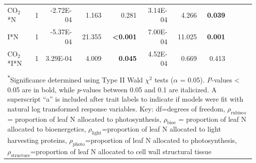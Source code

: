 \begin{landscape}
\begin{table}[]
{\begin{tabular}{p{3cm}p{0.5cm}p{1.75cm}p{1.5cm}p{1.5cm}p{1.75cm}p{1.5cm}p{1.5cm}p{1.75cm}p{1.5cm}p{1.5cm}}
            CO$_2$*N & \multicolumn{1}{r}{1}
            & \multicolumn{1}{r}{-2.72E-04}     & \multicolumn{1}{r}{1.163}         & \multicolumn{1}{r}{0.281}
            & \multicolumn{1}{r}{3.14E-04}      & \multicolumn{1}{r}{4.266}         & \multicolumn{1}{r}{\textbf{0.039}}
            & \multicolumn{1}{r}{}              & \multicolumn{1}{r}{}              & \multicolumn{1}{r}{} 
            \\

            I*N & \multicolumn{1}{r}{1}
            & \multicolumn{1}{r}{-5.37E-04}     & \multicolumn{1}{r}{21.355}        & \multicolumn{1}{r}{\textbf{<0.001}}
            & \multicolumn{1}{r}{7.00E-04}      & \multicolumn{1}{r}{11.025}        & \multicolumn{1}{r}{\textbf{0.001}}
            & \multicolumn{1}{r}{}              & \multicolumn{1}{r}{}              & \multicolumn{1}{r}{} 
            \\

            CO$_2$*I*N & \multicolumn{1}{r}{1}
            & \multicolumn{1}{r}{3.29E-04}      & \multicolumn{1}{r}{4.009}         & \multicolumn{1}{r}{\textbf{0.045}}
            & \multicolumn{1}{r}{4.52E-04}      & \multicolumn{1}{r}{0.669}         & \multicolumn{1}{r}{0.413}
            & \multicolumn{1}{r}{}              & \multicolumn{1}{r}{}              & \multicolumn{1}{r}{} 
            \\
            \hline
            \\
            \multicolumn{11}{p{22.5cm}}{\textsuperscript{$*$}Significance determined using Type II Wald $\chi^{2}$ tests ($\alpha$ = 0.05). \textit{P}-values < 0.05 are in bold, while \textit{p}-values between 0.05 and 0.1 are italicized. A superscript “a” is included after trait labels to indicate if models were fit with natural log transformed response variables. Key: df=degrees of freedom, $\rho_\mathrm{rubisco}$ = proportion of leaf N allocated to photosynthesis, $\rho_\mathrm{bioe}$ = proportion of leaf N allocated to bioenergetics, $\rho_\mathrm{light}$=proportion of leaf N allocated to light harvesting proteins, $\rho_\mathrm{photo}$=proportion of leaf N allocated to photosynthesis, $\rho_\mathrm{structure}$=proportion of leaf N allocated to cell wall structural tissue}
    \end{tabular}}
    \label{tab:table5.3}
    \end{table}
\end{landscape}
\clearpage

